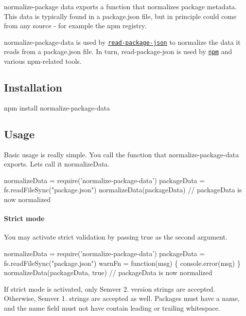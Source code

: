 normalize-\/package data exports a function that normalizes package metadata. This data is typically found in a package.\+json file, but in principle could come from any source -\/ for example the npm registry.

normalize-\/package-\/data is used by \href{https://npmjs.org/package/read-package-json}{\tt read-\/package-\/json} to normalize the data it reads from a package.\+json file. In turn, read-\/package-\/json is used by \href{https://npmjs.org/package/npm}{\tt npm} and various npm-\/related tools.

\subsection*{Installation}


\begin{DoxyCode}
npm install normalize-package-data
\end{DoxyCode}


\subsection*{Usage}

Basic usage is really simple. You call the function that normalize-\/package-\/data exports. Let\textquotesingle{}s call it {\ttfamily normalize\+Data}.


\begin{DoxyCode}
normalizeData = require('normalize-package-data')
packageData = fs.readFileSync("package.json")
normalizeData(packageData)
// packageData is now normalized
\end{DoxyCode}


\paragraph*{Strict mode}

You may activate strict validation by passing true as the second argument.


\begin{DoxyCode}
normalizeData = require('normalize-package-data')
packageData = fs.readFileSync("package.json")
warnFn = function(msg) \{ console.error(msg) \}
normalizeData(packageData, true)
// packageData is now normalized
\end{DoxyCode}


If strict mode is activated, only Semver 2. version strings are accepted. Otherwise, Semver 1. strings are accepted as well. Packages must have a name, and the name field must not have contain leading or trailing whitespace.


